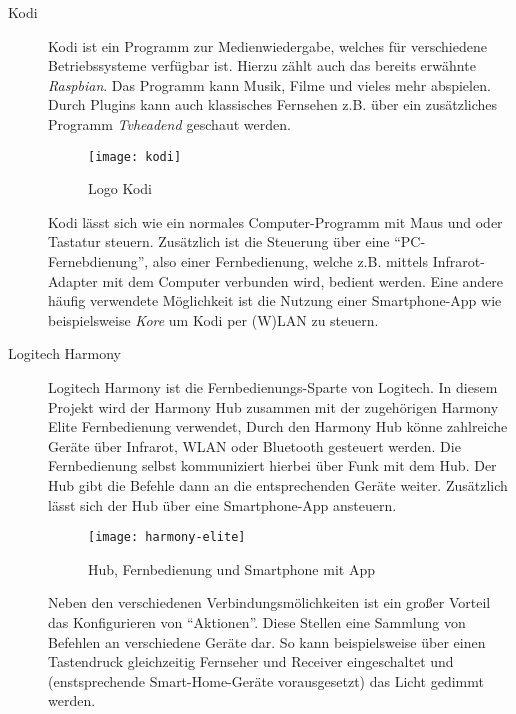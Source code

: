 \begin{description}
    \item[Kodi \cite{AboutKod6:online}]
        Kodi ist ein Programm zur Medienwiedergabe, welches für verschiedene Betriebssysteme verfügbar ist.
        Hierzu zählt auch das bereits erwähnte \textit{Raspbian}.
        Das Programm kann Musik, Filme und vieles mehr abspielen.
        Durch Plugins kann auch klassisches Fernsehen z.B.
        über ein zusätzliches Programm \textit{Tvheadend \cite{tvheadend:online}} geschaut werden.

        \begin{figure}[h!]
            \centering
            \texttt{[image: kodi]}
            \caption{Logo Kodi}\label{fig:kodi}
        \end{figure}

        Kodi lässt sich wie ein normales Computer-Programm mit Maus und oder Tastatur steuern.
        Zusätzlich ist die Steuerung über eine \enquote{PC-Fernebdienung},
        also einer Fernbedienung, welche z.B. mittels Infrarot-Adapter mit dem Computer verbunden wird,
        bedient werden.
        Eine andere häufig verwendete Möglichkeit ist die Nutzung einer Smartphone-App wie beispielsweise \textit{Kore} um Kodi per (W)LAN zu steuern.

    \item[Logitech Harmony \cite{HarmonyH15:online}]
        Logitech Harmony ist die Fernbedienungs-Sparte von Logitech.
        In diesem Projekt wird der Harmony Hub zusammen mit der zugehörigen Harmony Elite Fernbedienung verwendet,
        Durch den Harmony Hub könne zahlreiche Geräte über Infrarot, WLAN oder Bluetooth gesteuert werden.
        Die Fernbedienung selbst kommuniziert hierbei über Funk \cite{HowToPoi90:online} mit dem Hub.
        Der Hub gibt die Befehle dann an die entsprechenden Geräte weiter.
        Zusätzlich lässt sich der Hub über eine Smartphone-App ansteuern.

        \begin{figure}[h!]
            \centering
            \texttt{[image: harmony-elite]}
            \caption{Hub, Fernbedienung und Smartphone mit App}\label{fig:harmony}
        \end{figure}

        Neben den verschiedenen Verbindungsmölichkeiten ist ein großer Vorteil das Konfigurieren von \enquote{Aktionen}.
        Diese Stellen eine Sammlung von Befehlen an verschiedene Geräte dar.
        So kann beispielsweise über einen Tastendruck gleichzeitig Fernseher und Receiver eingeschaltet
        und (enstsprechende Smart-Home-Geräte vorausgesetzt) das Licht gedimmt werden.
\end{description}